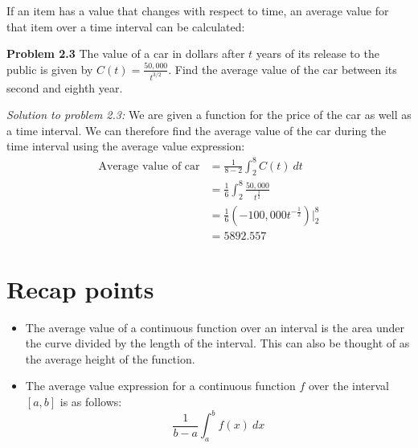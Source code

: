 \documentclass[11pt]{scrartcl}
\begin{document}
\noindent 
If an item has a value that changes with respect to time, an average value for that item over a time interval can be calculated:
\begin{tcolorbox}[colback=purple!5!white,colframe=purple!75!black]
\textbf{Problem 2.3} The value of a car in dollars after $t$ years of its release to the public is given by $C(t)=\frac{50,000}{t^{3/2}}$. Find the average value of the car between its second and eighth year. 
\end{tcolorbox}
\noindent 
\textit{Solution to problem 2.3:} We are given a function for the price of the car as well as a time interval. We can therefore find the average value of the car during the time interval using the average value expression: 
\begin{align*}
    \text{Average value of car} &=\frac{1}{8-2}\int_{2}^{8}{C(t) \ dt} \\
    &=\frac{1}{6}\int_{2}^{8}{\frac{50,000}{t^\frac{3}{2}}} \\
    &=\frac{1}{6}(-100,000t^{-\frac{1}{2}})\biggr \rvert_2^8 \\
    &=5892.557
\end{align*}
\section{Recap points}
\begin{itemize}
    \item The average value of a continuous function over an interval is the area under the curve divided by the length of the interval. This can also be thought of as the average height of the function. 
    \item The average value expression for a continuous function $f$ over the interval $[a,b]$ is as follows: 
    $$\frac{1}{b-a}\int_a^b f(x) \ dx$$
\end{itemize}
\end{document}
